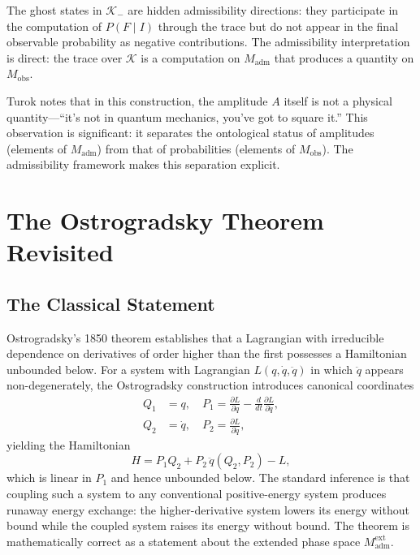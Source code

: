 \documentclass[12pt,a4paper]{article}
\theoremstyle{remark}
\begin{document}
The ghost states in $\mathcal{K}_-$ are hidden admissibility directions:
they participate in the computation of $P(F\mid I)$ through the trace but
do not appear in the final observable probability as negative contributions.
The admissibility interpretation is direct: the trace over $\mathcal{K}$
is a computation on $M_{\mathrm{adm}}$ that produces a quantity on
$M_{\mathrm{obs}}$.

Turok notes that in this construction, the amplitude $A$ itself is not
a physical quantity---``it's not in quantum mechanics, you've got to square
it.'' This observation is significant: it separates the ontological status
of amplitudes (elements of $M_{\mathrm{adm}}$) from that of probabilities
(elements of $M_{\mathrm{obs}}$). The admissibility framework makes this
separation explicit.


\section{The Ostrogradsky Theorem Revisited}

\subsection{The Classical Statement}

Ostrogradsky's 1850 theorem establishes that a Lagrangian with
irreducible dependence on derivatives of order higher than the first
possesses a Hamiltonian unbounded below. For a system with Lagrangian
$L(q,\dot{q},\ddot{q})$ in which $\ddot{q}$ appears non-degenerately,
the Ostrogradsky construction introduces canonical coordinates
\begin{align}
  Q_1 &= q, \quad
  P_1 = \frac{\partial L}{\partial\dot{q}} - \frac{d}{dt}\frac{\partial L}{\partial\ddot{q}},\\
  Q_2 &= \dot{q}, \quad
  P_2 = \frac{\partial L}{\partial\ddot{q}},
\end{align}
yielding the Hamiltonian
\begin{equation}
  H = P_1 Q_2 + P_2\,\ddot{q}(Q_2, P_2) - L,
\end{equation}
which is linear in $P_1$ and hence unbounded below. The standard inference
is that coupling such a system to any conventional positive-energy system
produces runaway energy exchange: the higher-derivative system lowers its
energy without bound while the coupled system raises its energy without
bound. The theorem is mathematically correct as a statement about the
extended phase space $M_{\mathrm{adm}}^{\mathrm{ext}}$.
\end{document}
